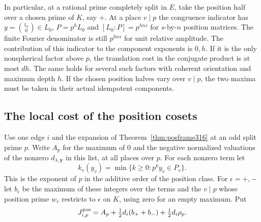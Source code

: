 \documentclass[a4paper,11pt]{article}
\theoremstyle{definition}
\theoremstyle{remark}
\numberwithin{equation}{section}
\begin{document}
In particular, at a rational prime completely split in \(E\),
take the position half over a chosen prime of \(K\), say \(+\).
At a place \(v\mid p\) the congruence indicator has
\(y=\binom{1_n}{0}\in L_0\), \(P=p^hL_0\) and
\([L_0:P]=p^{h ns}\) for \(s\)-by-\(n\) position matrices.
The finite Fourier denominator is still \(p^{h ns}\) for unit
relative amplitude. The contribution of this indicator to the
component exponents is \(0,h\). If it is the only nonspherical
factor above \(p\), the translation cost in the conjugate
product is at most \(dh\). The same holds for several such factors
with coherent orientation and maximum depth \(h\).
If the chosen position halves vary over \(v\mid p\), the two
maxima must be taken in their actual idempotent components.

\subsection{The local cost of the position cosets}\label{nav:VII-65}
Use one edge \(i\) and the expansion of
Theorem~\ref{thm:posframe316} at an odd split prime \(p\).
Write \(A_p\) for the maximum of \(0\) and the negative normalized
valuations of the nonzero \(d_{\lambda,\mathbf y}\) in this
list, at all places over \(p\). For each nonzero term let
\[
 k_v(y_v)=\min\{k\ge0:p^k y_v\in P_v\}.
\]
This is the exponent of \(p\) in the additive order of the
position class. For \(\epsilon=+,-\) let \(b_\epsilon\)
be the maximum of these integers over the terms and the
\(v\mid p\) whose position prime \(w_v\) restricts to
\(\epsilon\) on \(K\), using zero for an empty maximum. Put
\[
        J^{\rm pos}_{i,p}=A_p+
          \tfrac12d_i(b_++b_-)+\tfrac12d_i\rho_p .
\]
\end{document}
